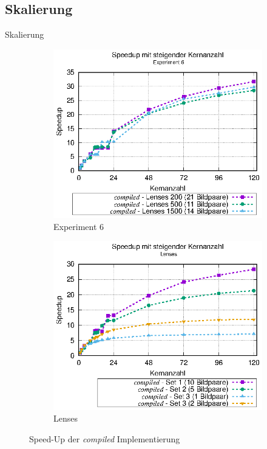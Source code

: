 \subsection{Skalierung}
\begin{frame}{Skalierung}
	\begin{center}
		\begin{figure}[h]
			\begin{subfigure}[b]{0.45\textwidth}
				\centering
				\includegraphics[width=\textwidth]{pdf/best_speedup_exp6_standalone}
				\caption{Experiment 6}
			\end{subfigure}
			\hfill
			\begin{subfigure}[b]{0.45\textwidth}
				\centering
				\includegraphics[width=\textwidth]{pdf/best_speedup_lenses_standalone}
				\caption{Lenses}
			\end{subfigure}
			\caption{Speed-Up der \textit{compiled} Implementierung}
		\end{figure}
	\end{center}
\end{frame}

